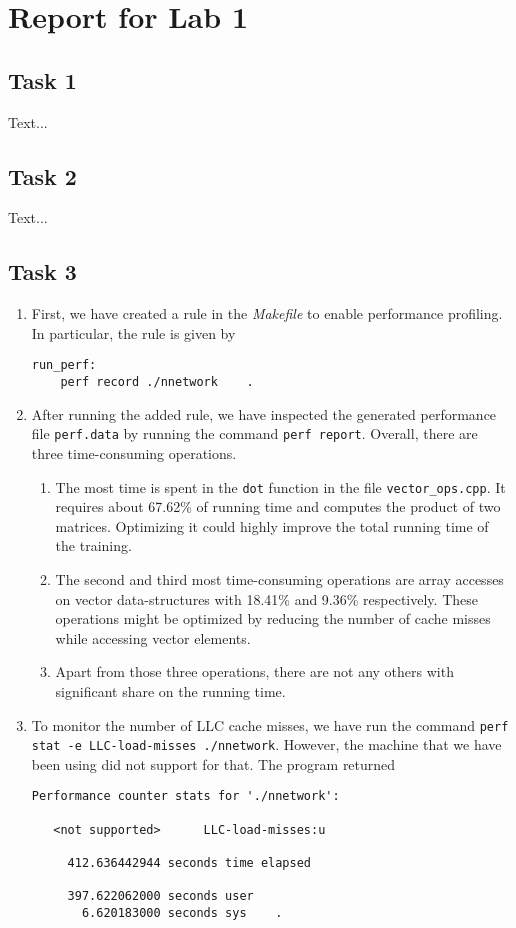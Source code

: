\documentclass[a4paper, DIV12, headsepline]{scrartcl}
\begin{document}
\section*{Report for Lab 1}
\subsection*{Task 1}
Text...

\subsection*{Task 2}
Text...

\subsection*{Task 3}
\begin{enumerate}[label=(\alph*)]
\item First, we have created a rule in the \textit{Makefile} to enable performance profiling. In particular, the rule is given by
\begin{verbatim}
run_perf:
    perf record ./nnetwork    .
\end{verbatim}

\item After running the added rule, we have inspected the generated performance file \texttt{perf.data} by running the command \texttt{perf report}. Overall, there are three time-consuming operations.
\begin{enumerate}[label=(\arabic*)]
\item The most time is spent in the \texttt{dot} function in the file \texttt{vector\_ops.cpp}. It requires about 67.62\% of running time and computes the product of two matrices. Optimizing it could highly improve the total running time of the training.
\item The second and third most time-consuming operations are array accesses on vector data-structures with 18.41\% and 9.36\% respectively. These operations might be optimized by reducing the number of cache misses while accessing vector elements.
\item Apart from those three operations, there are not any others with significant share on the running time. 
\end{enumerate}

\item To monitor the number of LLC cache misses, we have run the command \texttt{perf stat -e LLC-load-misses ./nnetwork}. However, the machine that we have been using did not support for that. The program returned
\begin{verbatim}
Performance counter stats for './nnetwork':

   <not supported>      LLC-load-misses:u

     412.636442944 seconds time elapsed
     
     397.622062000 seconds user
       6.620183000 seconds sys    .
\end{verbatim}

\end{enumerate}
\end{document}
